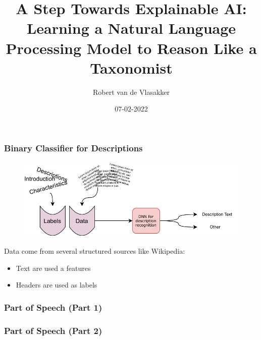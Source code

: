 \documentclass{beamer}
\title{A Step Towards Explainable AI: Learning a Natural Language Processing Model to Reason Like a Taxonomist}
\author{Robert van de Vlasakker}
\institute{Wageningen University \& Research}
\date{07-02-2022}
\begin{document}
\graphicspath{ {./figures/} }

\frame{\titlepage}

\begin{frame}
\frametitle{Binary Classifier for Descriptions}
\begin{figure} [htbp]
    \centering
    \includegraphics[width=\textwidth]{figures/midterm_explain_4.pdf}
\end{figure}
Data come from several structured sources like Wikipedia:
\begin{itemize}
    \item Text are used a features
    \item Headers are used as labels
\end{itemize}
\end{frame}


\begin{frame}
\frametitle{Part of Speech (Part 1)}
\begin{figure} [htbp]
        \centering
        
        \label{fig:PoS_example}
\end{figure}
\end{frame}


\begin{frame}
\frametitle{Part of Speech (Part 2)}
\begin{figure} [htbp]
        \centering
        
        \label{fig:PoS_example2}
\end{figure}
\end{frame}
\end{document}
